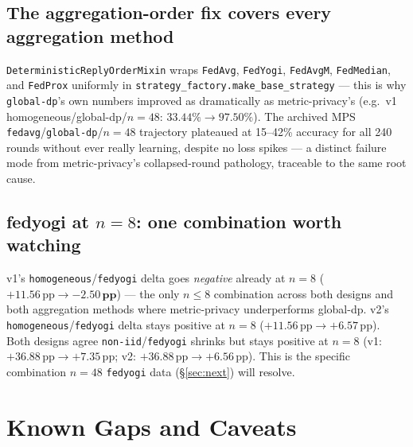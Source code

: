\documentclass[11pt]{article}
\newcommand{\code}[1]{\texttt{#1}}
\newcommand{\pp}{\,\text{pp}}
\begin{document}
\subsection{The aggregation-order fix covers every aggregation method}

\code{DeterministicReplyOrderMixin} wraps \code{FedAvg}, \code{FedYogi}, \code{FedAvgM},
\code{FedMedian}, and \code{FedProx} uniformly in
\code{strategy\_factory.make\_base\_strategy} --- this is why \code{global-dp}'s own numbers
improved as dramatically as metric-privacy's (e.g.\ v1 homogeneous/global-dp/$n{=}48$:
$33.44\% \to 97.50\%$). The archived MPS \code{fedavg}/\code{global-dp}/$n{=}48$ trajectory
plateaued at 15--42\% accuracy for all 240 rounds without ever really learning, despite no loss
spikes --- a distinct failure mode from metric-privacy's collapsed-round pathology, traceable to
the same root cause.

\subsection{fedyogi at $n{=}8$: one combination worth watching}

v1's \code{homogeneous}/\code{fedyogi} delta goes \emph{negative} already at $n{=}8$
($+11.56\pp \to \mathbf{-2.50\pp}$) --- the only $n \leq 8$ combination across both designs and
both aggregation methods where metric-privacy underperforms global-dp. v2's
\code{homogeneous}/\code{fedyogi} delta stays positive at $n{=}8$ ($+11.56\pp \to +6.57\pp$). Both
designs agree \code{non-iid}/\code{fedyogi} shrinks but stays positive at $n{=}8$ (v1:
$+36.88\pp \to +7.35\pp$; v2: $+36.88\pp \to +6.56\pp$). This is the specific combination
$n{=}48$ \code{fedyogi} data (\S\ref{sec:next}) will resolve.

\section{Known Gaps and Caveats}
\end{document}
